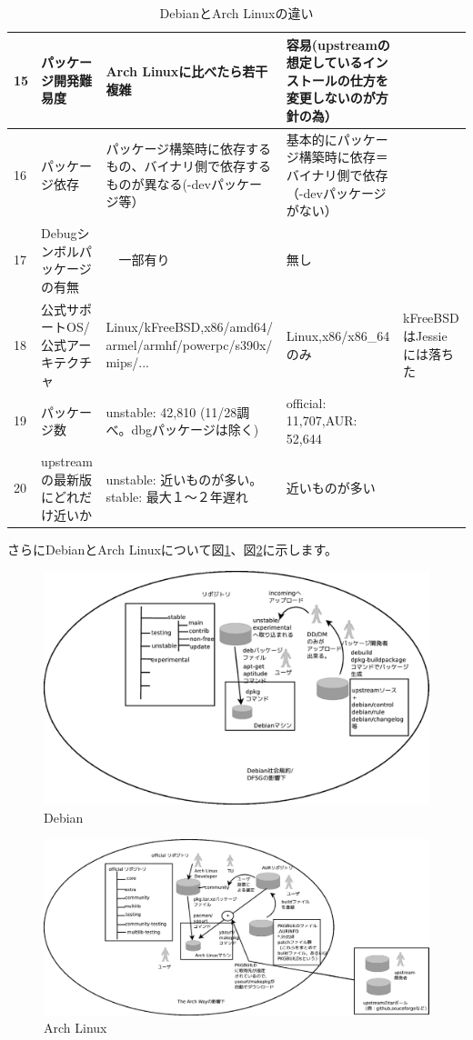 \documentclass[mingoth,a4paper]{jsarticle}
\begin{document}
\begin{table}[htpb!]
\begin{tabular}{|l|p{3cm}|p{4cm}|p{4cm}|p{3cm}|}
15 & パッケージ開発難易度 & Arch Linuxに比べたら若干複雑 & 容易(upstreamの想定しているインストールの仕方を変更しないのが方針の為）& \\ \hline
16 & パッケージ依存 & パッケージ構築時に依存するもの、バイナリ側で依存するものが異なる(-devパッケージ等） & 基本的にパッケージ構築時に依存＝バイナリ側で依存（-devパッケージがない）& \\ \hline
17 & Debugシンボルパッケージの有無 &　一部有り & 無し & \\ \hline
18 & 公式サポートOS/公式アーキテクチャ & Linux/kFreeBSD,x86/amd64/ armel/armhf/powerpc/s390x/ mips/... & Linux,x86/x86\_64のみ & kFreeBSDはJessieには落ちた\\ \hline
19 & パッケージ数 & unstable: 42,810 (11/28調べ。dbgパッケージは除く) & official: 11,707,AUR: 52,644 & \\ \hline
20 & upstreamの最新版にどれだけ近いか & unstable: 近いものが多い。stable: 最大１〜２年遅れ & 近いものが多い & \\ \hline
\end{tabular}
\caption{DebianとArch Linuxの違い}
\label{tab:diff-debian-arch}
\end{table}

 さらにDebianとArch Linuxについて図\ref{fig:debian-schema}、図\ref{fig:arch-linux-schema}に示します。

\begin{figure}[H]
\begin{center}
 \includegraphics[width=0.8\hsize]{image201411/debian-schema_mono.eps}
 \caption{Debian}\label{fig:debian-schema}
\end{center}
\end{figure}

\begin{figure}[H]
\begin{center}
 \includegraphics[width=0.8\hsize]{image201411/arch-schema_mono.eps}
 \caption{Arch Linux}\label{fig:arch-linux-schema}
\end{center}
\end{figure}
\end{document}
